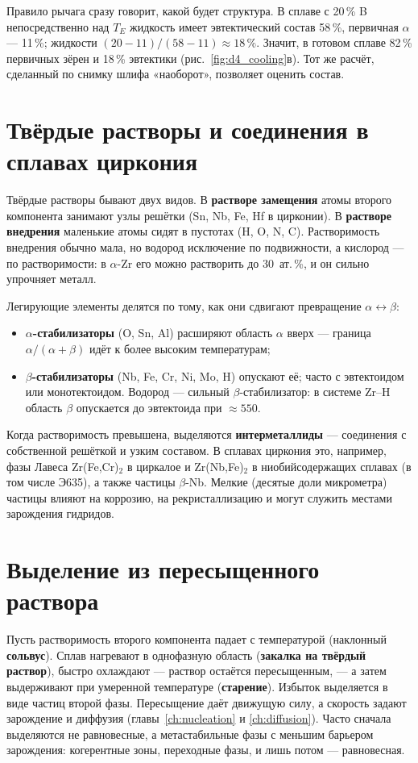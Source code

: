Правило рычага сразу говорит, какой будет структура. В сплаве с 20\,\% B непосредственно над $T_E$ жидкость
имеет эвтектический состав 58\,\%, первичная $\alpha$ --- 11\,\%; жидкости $(20-11)/(58-11)\approx18\,\%$. Значит,
в готовом сплаве 82\,\% первичных зёрен и 18\,\% эвтектики (рис.~\ref{fig:d4_cooling}в). Тот же расчёт, сделанный по
снимку шлифа «наоборот», позволяет оценить состав.

\section{Твёрдые растворы и соединения в сплавах циркония}

Твёрдые растворы бывают двух видов. В \textbf{растворе замещения} атомы второго компонента занимают узлы решётки (Sn,
Nb, Fe, Hf в цирконии). В \textbf{растворе внедрения} маленькие атомы сидят в пустотах (H, O, N, C). Растворимость
внедрения обычно мала, но водород исключение по подвижности, а кислород --- по растворимости: в $\alpha$-Zr его можно
растворить до 30~ат.\,\%, и он сильно упрочняет металл.

Легирующие элементы делятся по тому, как они сдвигают превращение $\alpha\leftrightarrow\beta$:
\begin{itemize}
\item \textbf{$\alpha$-стабилизаторы} (O, Sn, Al) расширяют область $\alpha$ вверх --- граница $\alpha/(\alpha+\beta)$ идёт
  к более высоким температурам;
\item \textbf{$\beta$-стабилизаторы} (Nb, Fe, Cr, Ni, Mo, H) опускают её; часто с эвтектоидом или монотектоидом. Водород ---
  сильный $\beta$-стабилизатор: в системе Zr--H область $\beta$ опускается до эвтектоида при $\approx550$\degC.
\end{itemize}
Когда растворимость превышена, выделяются \textbf{интерметаллиды} --- соединения с собственной решёткой и узким составом.
В сплавах циркония это, например, фазы Лавеса Zr(Fe,Cr)$_2$ в циркалое и Zr(Nb,Fe)$_2$ в ниобийсодержащих
сплавах (в том числе Э635), а также частицы $\beta$-Nb. Мелкие (десятые доли микрометра) частицы влияют на
коррозию, на рекристаллизацию и могут служить местами зарождения гидридов.

\section{Выделение из пересыщенного раствора}

Пусть растворимость второго компонента падает с температурой (наклонный \textbf{сольвус}). Сплав нагревают в
однофазную область (\textbf{закалка на твёрдый раствор}), быстро охлаждают --- раствор остаётся пересыщенным, --- а
затем выдерживают при умеренной температуре (\textbf{старение}). Избыток выделяется в виде частиц второй фазы.
Пересыщение даёт движущую силу, а скорость задают зарождение и диффузия (главы~\ref{ch:nucleation} и
\ref{ch:diffusion}). Часто сначала выделяются не равновесные, а метастабильные фазы с меньшим барьером
зарождения: когерентные зоны, переходные фазы, и лишь потом --- равновесная.

